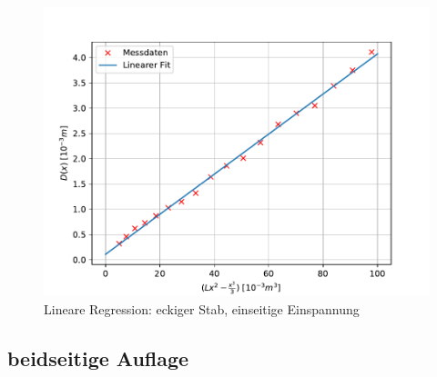 \begin{figure}[!htb]
  \centering
  \includegraphics[scale=0.75]{content/plots/ecke.pdf}
  \caption{Lineare Regression: eckiger Stab, einseitige Einspannung}
  \label{fig:LinRegecke}
\end{figure}



\subsection{beidseitige Auflage}
\label{subsec:beidAuf}

